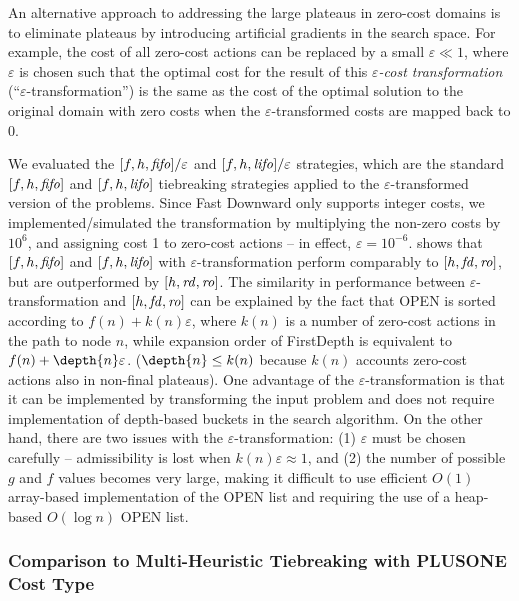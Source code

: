 An alternative approach to addressing the large plateaus in zero-cost domains is
to eliminate plateaus by introducing artificial gradients in the search space.
For example, the cost of all zero-cost actions can be replaced by a small $\varepsilon\ll 1$, where 
$\varepsilon$ is chosen such that the optimal cost for the result of  this \emph{$\varepsilon$-cost transformation} (``$\varepsilon$-transformation'') is the same as the cost of the optimal solution to the original domain with zero costs when the $\varepsilon$-transformed costs are mapped back to 0.

We evaluated the $[f,h,{\mbox{\textit{fifo}}}]/\varepsilon$ and $[f,h,{\mbox{\textit{lifo}}}]/\varepsilon$ strategies, which are the standard $[f,h,{\mbox{\textit{fifo}}}]$ and $[f,h,{\mbox{\textit{lifo}}}]$ tiebreaking strategies applied to  the $\varepsilon$-transformed version of the problems.
Since Fast Downward  only supports integer costs, we implemented/simulated the transformation by multiplying the non-zero costs by $10^6$, and assigning cost 1 to zero-cost actions -- in effect,  $\varepsilon=10^{-6}$.
 shows that $[f,h,{\mbox{\textit{fifo}}}]$ and $[f,h,{\mbox{\textit{lifo}}}]$ with $\varepsilon$-transformation
 perform comparably to $[h,{\mbox{\textit{fd}}},{\mbox{\textit{ro}}}]$, but are outperformed by $[h,{\mbox{\textit{rd}}},{\mbox{\textit{ro}}}]$.
% 
The similarity in performance between $\varepsilon$-transformation and $[h,{\mbox{\textit{fd}}},{\mbox{\textit{ro}}}]$ can be explained by the fact that  OPEN is sorted according to  $f(n)+k(n)\varepsilon$,
where $k(n)$ is a number of zero-cost actions in the path to node $n$,
while expansion order of FirstDepth is equivalent to $f(n)+\depth{n}\varepsilon$.
($\depth{n}\leq k(n)$ because $k(n)$ accounts zero-cost actions also in non-final plateaus).
% 
One advantage of the $\varepsilon$-transformation is that it can be implemented by transforming the input problem and does not require implementation of depth-based buckets in the search algorithm.
On the other hand, there are two issues with the $\varepsilon$-transformation:
(1) $\varepsilon$ must be chosen carefully -- admissibility is lost  when $k(n)\varepsilon\approx 1$, and
(2) the number of possible $g$ and $f$ values becomes very large, making it difficult to use efficient $O(1)$ array-based implementation of the OPEN list and requiring the use of a heap-based $O(\log n)$ OPEN list.

\subsubsection{Comparison to Multi-Heuristic Tiebreaking with PLUSONE Cost Type}




